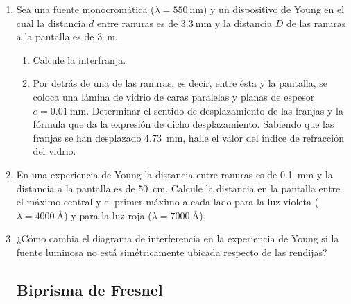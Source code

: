 \documentclass[11pt,spanish,a4paper]{article}
\begin{document}
\begin{enumerate}
\item
Sea una fuente monocromática (\(\lambda= \SI{550}{\nano\metre}\)) y un dispositivo de Young en el cual la distancia \(d\) entre ranuras es de \(\SI{3.3}{\milli\metre}\) y la distancia \(D\) de las ranuras a la pantalla es de \SI{3}{\metre}.
\begin{enumerate}
	\item Calcule la interfranja.
	\item Por detrás de una de las ranuras, es decir, entre ésta y la pantalla, se coloca una lámina de vidrio de caras paralelas y planas de espesor \(e = \SI{0.01}{\milli\metre}\).
Determinar el sentido de desplazamiento de las franjas y la fórmula que da la expresión de dicho desplazamiento.
Sabiendo que las franjas se han desplazado \SI{4.73}{\milli\metre}, halle el valor del índice de refracción del vidrio.
\end{enumerate}


\item 
En una experiencia de Young la distancia entre ranuras es de \SI{0.1}{\milli\metre} y la distancia a la pantalla es de \SI{50}{\centi\metre}. Calcule la distancia en la pantalla entre el máximo central y el primer máximo a cada lado para la luz violeta (\(\lambda= \SI{4000}{\angstrom}\)) y para la luz roja (\(\lambda= \SI{7000}{\angstrom}\)).


\item 
¿Cómo cambia el diagrama de interferencia en la experiencia de Young si la fuente luminosa no está simétricamente ubicada respecto de las rendijas?


\subsection*{Biprisma de Fresnel}


\end{enumerate}
\end{document}
